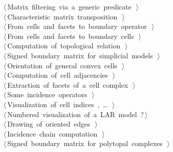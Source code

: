 \documentclass[11pt,oneside]{article}	%
\begin{document}
\begin{flushleft}
\begin{list}{}{}
\mbox{}\verb@@\hbox{$\langle\,$Matrix filtering via a generic predicate\nobreak\ {\footnotesize {}}$\,\rangle$}\verb@@\\
\mbox{}\verb@@\hbox{$\langle\,$Characteristic matrix transposition\nobreak\ {\footnotesize {}}$\,\rangle$}\verb@@\\
\mbox{}\verb@@\hbox{$\langle\,$From cells and facets to boundary operator\nobreak\ {\footnotesize {}}$\,\rangle$}\verb@@\\
\mbox{}\verb@@\hbox{$\langle\,$From cells and facets to boundary cells\nobreak\ {\footnotesize {}}$\,\rangle$}\verb@@\\
\mbox{}\verb@@\hbox{$\langle\,$Computation of topological relation\nobreak\ {\footnotesize {}}$\,\rangle$}\verb@@\\
\mbox{}\verb@@\hbox{$\langle\,$Signed boundary matrix for simplicial models\nobreak\ {\footnotesize {}}$\,\rangle$}\verb@@\\
\mbox{}\verb@@\hbox{$\langle\,$Orientation of general convex cells\nobreak\ {\footnotesize {}}$\,\rangle$}\verb@@\\
\mbox{}\verb@@\hbox{$\langle\,$Computation of cell adjacencies\nobreak\ {\footnotesize {}}$\,\rangle$}\verb@@\\
\mbox{}\verb@@\hbox{$\langle\,$Extraction of facets of a cell complex\nobreak\ {\footnotesize {}}$\,\rangle$}\verb@@\\
\mbox{}\verb@@\hbox{$\langle\,$Some incidence operators\nobreak\ {\footnotesize {}}$\,\rangle$}\verb@@\\
\mbox{}\verb@@\hbox{$\langle\,$Visualization of cell indices\nobreak\ {\footnotesize {}, \ldots\ }$\,\rangle$}\verb@@\\
\mbox{}\verb@@\hbox{$\langle\,$Numbered visualization of a LAR model\nobreak\ {\footnotesize ?}$\,\rangle$}\verb@@\\
\mbox{}\verb@@\hbox{$\langle\,$Drawing of oriented edges\nobreak\ {\footnotesize {}}$\,\rangle$}\verb@@\\
\mbox{}\verb@@\hbox{$\langle\,$Incidence chain computation\nobreak\ {\footnotesize {}}$\,\rangle$}\verb@@\\
\mbox{}\verb@@\hbox{$\langle\,$Signed boundary matrix for polytopal complexes\nobreak\ {\footnotesize {}}$\,\rangle$}\verb@@\\

\end{list}
\end{flushleft}
\end{document}
